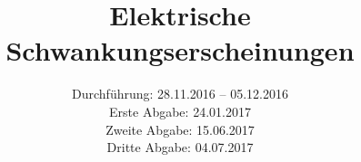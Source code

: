 

\subject{Versuch 57}
\title{Elektrische Schwankungserscheinungen}
\date{Durchführung: 28.11.2016 -- 05.12.2016 \\
      Erste Abgabe: 24.01.2017 \\
      Zweite Abgabe: 15.06.2017 \\
      Dritte Abgabe: 04.07.2017}



\maketitle
\newpage







\newpage


\printbibliography


